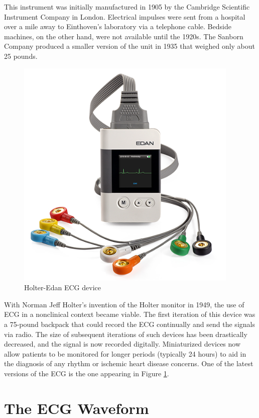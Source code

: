 This instrument was initially manufactured in 1905 by the Cambridge Scientific Instrument Company in London. Electrical impulses were sent from a hospital over a mile away to Einthoven's laboratory via a telephone cable. Bedside machines, on the other hand, were not available until the 1920s. The Sanborn Company produced a smaller version of the unit in 1935 that weighed only about 25 pounds.

\begin{figure}[H]
\centering
\includegraphics[scale=0.7]{img/holter_edan_ecg.PNG}
\caption{Holter-Edan ECG device}
\label{fig:holter_monitor}
\end{figure}

With Norman Jeff Holter's invention of the Holter monitor in 1949, the use of ECG in a nonclinical context became viable. The first iteration of this device was a 75-pound backpack that could record the ECG continually and send the signals via radio. The size of subsequent iterations of such devices has been drastically decreased, and the signal is now recorded digitally. Miniaturized devices now allow patients to be monitored for longer periods (typically 24 hours) to aid in the diagnosis of any rhythm or ischemic heart disease concerns. One of the latest versions of the ECG is the one appearing in Figure \ref{fig:holter_monitor}.

\section{The ECG Waveform} \label{ecg_waveform}

